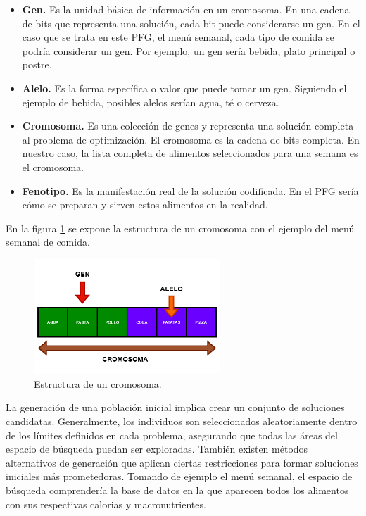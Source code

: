 \begin{itemize}
    \item \textbf{Gen.} Es la unidad básica de información en un cromosoma. En una cadena de bits que representa una solución, cada bit puede considerarse un gen. En el caso que se trata en este PFG, el menú semanal, cada tipo de comida se podría considerar un gen. Por ejemplo, un gen sería bebida, plato principal o postre.
    \item \textbf{Alelo.} Es la forma específica o valor que puede tomar un gen. Siguiendo el ejemplo de bebida, posibles alelos serían agua, té o cerveza.
    \item \textbf{Cromosoma.} Es una colección de genes y representa una solución completa al problema de optimización. El cromosoma es la cadena de bits completa. En nuestro caso, la lista completa de alimentos seleccionados para una semana es el cromosoma. 
    \item \textbf{Fenotipo.} Es la manifestación real de la solución codificada. En el PFG sería cómo se preparan y sirven estos alimentos en la realidad.
\end{itemize}

En la figura \ref{fig:cromosoma} se expone la estructura de un cromosoma con el ejemplo del menú semanal de comida.

\begin{figure}[H]
  \centering
  \includegraphics[width=0.625\textwidth]{figures/cromosoma.png}
  \caption{Estructura de un cromosoma.}
  \label{fig:cromosoma}
\end{figure}
\newpage
La generación de una población inicial implica crear un conjunto de soluciones candidatas. Generalmente, los individuos son seleccionados aleatoriamente dentro de los límites definidos en cada problema, asegurando que todas las áreas del espacio de búsqueda puedan ser exploradas. También existen métodos alternativos de generación que aplican ciertas restricciones para formar soluciones iniciales más prometedoras. Tomando de ejemplo el menú semanal, el espacio de búsqueda comprendería la base de datos en la que aparecen todos los alimentos con sus respectivas calorias y macronutrientes. 

